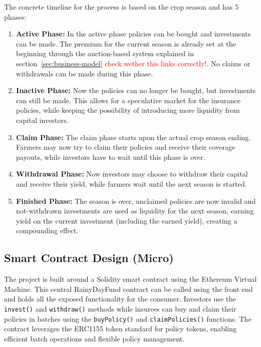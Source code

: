 \documentclass[11pt,a4paper]{article}
\begin{document}
	The concrete timeline for the process is based on the crop season and has 5 phases:
	\begin{enumerate}
		\item \textbf{Active Phase:} In the active phase policies can be bought and investments can be made.
			The premium for the current season is already set at the beginning through the auction-based system explained in section~\ref{sec:business-model} \textcolor{red}{check wether this links correctly!}.
			No claims or withdrawals can be made during this phase.
		\item \textbf{Inactive Phase:} Now the policies can no longer be bought, but investments can still be made.
			This allows for a speculative market for the insurance policies, while keeping the possibility of introducing more liquidity from capital investors.
		\item \textbf{Claim Phase:} The claim phase starts upon the actual crop season ending.
			Farmers may now try to claim their policies and receive their coverage payouts, while investors have to wait until this phase is over.
		\item \textbf{Withdrawal Phase:} Now investors may choose to withdraw their capital and receive their yield, while farmers wait until the next season is started.
		\item \textbf{Finished Phase:} The season is over, unclaimed policies are now invalid and not-withdrawn investments are used as liquidity for the next season, earning yield on the current investment (including the earned yield), creating a compounding effect.
        \label{enum:phases}
	\end{enumerate}


	\subsection{Smart Contract Design (Micro)}\label{subsec:smart-contract-design}
	The project is built around a Solidity smart contract using the Ethereum Virtual Machine.
	This central RainyDayFund contract can be called using the front end and holds all the exposed functionality for the consumer.
	Investors use the \texttt{invest()} and \texttt{withdraw()} methods while insurees can buy and claim their policies in batches using the \texttt{buyPolicy()} and \texttt{claimPolicies()} functions.
	The contract leverages the ERC1155 token standard for policy tokens, enabling efficient batch operations and flexible policy management.
\end{document}
